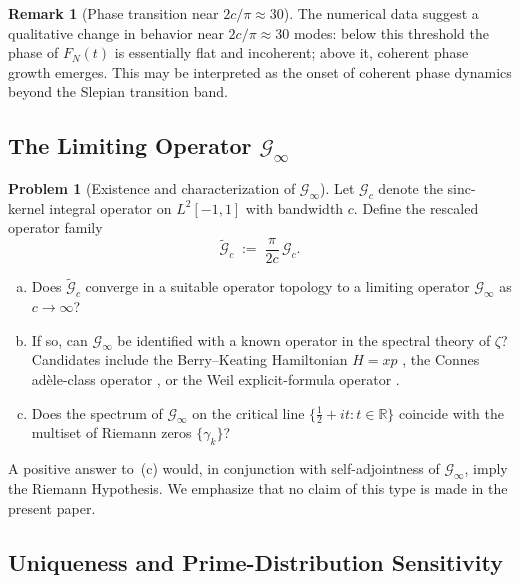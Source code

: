 \documentclass[12pt,a4paper]{amsart}
\theoremstyle{definition}
\newtheorem{problem}{Problem}[section]
\newtheorem{remark}[theorem]{Remark}
\newcommand{\R}{\mathbb{R}}
\newcommand{\Gc}{\mathcal{G}_c}
\newcommand{\Gcinf}{\mathcal{G}_\infty}
\begin{document}
\begin{remark}[Phase transition near $2c/\pi \approx 30$]
\label{rem:phase-transition}
The numerical data suggest a qualitative change in behavior near
$2c/\pi \approx 30$ modes: below this threshold the phase of
$F_N(t)$ is essentially flat and incoherent; above it, coherent
phase growth emerges. This may be interpreted as the onset of
coherent phase dynamics beyond the Slepian transition band.
\end{remark}

\subsection{The Limiting Operator $\mathcal{G}_\infty$}
\label{ssec:prob2}

\begin{problem}[Existence and characterization of $\Gcinf$]
\label{prob:Ginfty}
Let $\Gc$ denote the sinc-kernel integral operator on $L^2[-1,1]$
with bandwidth $c$. Define the rescaled operator family
\begin{equation}
\label{eq:rescaled-op}
\widetilde{\mathcal{G}}_c
\;:=\;
\frac{\pi}{2c}\,\mathcal{G}_c.
\end{equation}
\begin{enumerate}[(a)]
\item Does $\widetilde{\mathcal{G}}_c$ converge in a suitable
operator topology to a limiting operator $\Gcinf$
as $c \to \infty$?
\item If so, can $\Gcinf$ be identified with a known operator
in the spectral theory of $\zeta$? Candidates include the
Berry--Keating Hamiltonian $H = xp$ \cite{BerryKeating1999},
the Connes ad\`ele-class operator \cite{Connes1999}, or the
Weil explicit-formula operator \cite{Weil1952}.
\item Does the spectrum of $\Gcinf$ on the critical line
$\{\frac{1}{2} + it : t \in \R\}$ coincide with the
multiset of Riemann zeros $\{\gamma_k\}$?
\end{enumerate}
A positive answer to~(c) would, in conjunction with
self-adjointness of $\Gcinf$, imply the Riemann Hypothesis.
We emphasize that no claim of this type is made in the present paper.
\end{problem}

\subsection{Uniqueness and Prime-Distribution Sensitivity}
\label{ssec:prob3}
\end{document}
